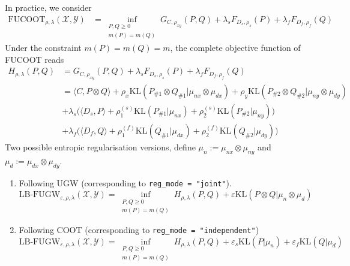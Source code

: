 \documentclass{article}
\theoremstyle{remark}
\begin{document}
\newpage
In practice, we consider
\begin{equation}
    \label{lbfugw2}
    \begin{split}
       \text{FUCOOT}_{\rho, \lambda}(\mathcal X, \mathcal Y) &= \inf_{\substack{P,Q \geq 0 \\ m(P) = m(Q)}} G_{C,\rho_{xy}}(P,Q) + \lambda_s F_{D_s,\rho_{s}}(P) + \lambda_f F_{D_f,\rho_{f}}(Q)
    \end{split}
\end{equation}
Under the constraint $m(P) = m(Q) = m$, the complete objective function of FUCOOT reads
\begin{equation*}
    \begin{split}
        H_{\rho, \lambda}(P,Q) &= G_{C,\rho_{xy}}(P,Q) + \lambda_s F_{D_s,\rho_{s}}(P) + \lambda_f F_{D_f,\rho_{f}}(Q) \\
        &= \langle C, P \otimes Q \rangle
        + \rho_x \text{KL}(P_{\# 1} \otimes Q_{\# 1} \vert \mu_{nx} \otimes \mu_{dx}) 
        + \rho_y \text{KL}(P_{\# 2} \otimes Q_{\# 2} \vert \mu_{ny} \otimes \mu_{dy}) \\
        &+ \lambda_s \Big( \langle D_s, P \rangle + \rho_1^{(s)} \text{KL}(P_{\# 1} \vert \mu_{nx}) + \rho_2^{(s)} \text{KL}(P_{\# 2} \vert \mu_{ny}) \Big) \\
        &+ \lambda_f \Big( \langle D_f, Q \rangle + \rho_1^{(f)} \text{KL}(Q_{\# 1} \vert \mu_{dx}) + \rho_2^{(f)} \text{KL}(Q_{\# 2} \vert \mu_{dy}) \Big)
    \end{split}
\end{equation*}
Two possible entropic regularisation versions, define $\mu_n := \mu_{nx} \otimes \mu_{ny}$ and $\mu_d := \mu_{dx} \otimes \mu_{dy}$.
\begin{enumerate}
    \item Following UGW (corresponding to \texttt{reg\_mode = "joint"}).
    \begin{equation}
        \label{ent_ugw}
       \text{LB-FUGW}_{\varepsilon, \rho, \lambda}(\mathcal X, \mathcal Y) = \inf_{\substack{P,Q \geq 0 \\ m(P) = m(Q)}} H_{\rho, \lambda}(P,Q) + \varepsilon \text{KL}( P \otimes Q \vert \mu_n \otimes \mu_d)
    \end{equation}
    
    \item Following COOT (corresponding to \texttt{reg\_mode = "independent"})
    \begin{equation}
        \label{ent_coot}
       \text{LB-FUGW}_{\varepsilon, \rho, \lambda}(\mathcal X, \mathcal Y) = \inf_{\substack{P,Q \geq 0 \\ m(P) = m(Q)}} H_{\rho, \lambda}(P,Q) + \varepsilon_s \text{KL}( P \vert \mu_n) + \varepsilon_f \text{KL}( Q \vert \mu_d)
    \end{equation}    
\end{enumerate}
\end{document}
